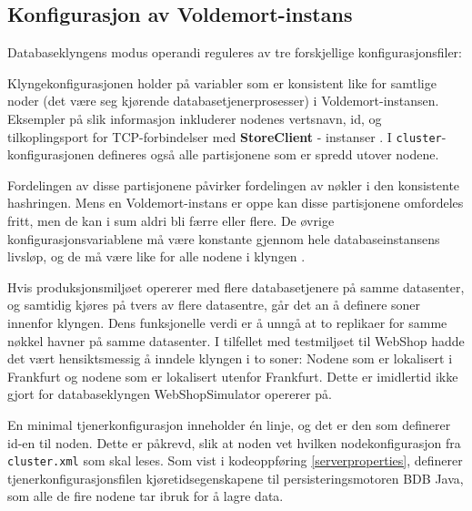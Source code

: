 \subsection{Konfigurasjon av Voldemort-instans}

Databaseklyngens modus operandi reguleres av tre forskjellige konfigurasjonsfiler:



Klyngekonfigurasjonen holder på variabler som er konsistent like for samtlige noder (det være seg kjørende database\-tjener\-prosesser) i Voldemort-instansen. Eksempler på slik informasjon inkluderer nodenes vertsnavn, id, og tilkoplingsport for TCP-forbindelser med \textbf{StoreClient} - instanser \citep{kreps2009}. I \texttt{cluster}-konfigurasjonen defineres også alle partisjonene som er spredd utover nodene.

Fordelingen av disse partisjonene påvirker fordelingen av nøkler i den konsistente hashringen. Mens en Voldemort-instans er oppe kan disse partisjonene omfordeles fritt, men de kan i sum aldri bli færre eller flere. De øvrige konfigurasjonsvariablene må være konstante gjennom hele databaseinstansens livsløp, og de må være like for alle nodene i klyngen \citep{kreps2009}.

Hvis produksjonsmiljøet opererer med flere databasetjenere på samme datasenter, og samtidig kjøres på tvers av flere datasentre, går det an å definere soner innenfor klyngen. Dens funksjonelle verdi er å unngå at to replikaer for samme nøkkel havner på samme datasenter. I tilfellet med testmiljøet til WebShop hadde det vært hensiktsmessig å inndele klyngen i to soner: Nodene som er lokalisert i Frankfurt og nodene som er lokalisert utenfor Frankfurt. Dette er imidlertid ikke gjort for databaseklyngen WebShopSimulator opererer på.



En minimal tjenerkonfigurasjon inneholder én linje, og det er den som definerer id-en til noden. Dette er påkrevd, slik at noden vet hvilken nodekonfigurasjon fra \texttt{cluster.xml} som skal leses. Som vist i kodeoppføring \ref{serverproperties}, definerer tjener\-konfigurasjons\-filen kjøretidsegenskapene til persisterings\-motoren BDB Java, som alle de fire nodene tar ibruk for å lagre data.

